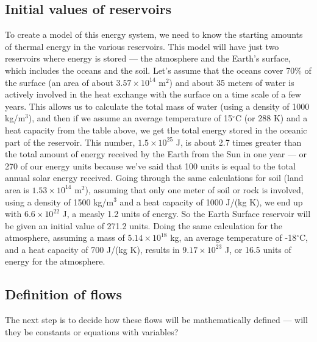 \documentclass[11pt,letterpaper]{article}
\begin{document}
\subsection{Initial values of reservoirs}
To create a model of this energy system, we need to know the starting amounts of thermal energy in the various reservoirs. This model
will have just two reservoirs where energy is stored --- the atmosphere and the Earth's surface, which includes the oceans and the soil.
Let's assume that the oceans cover 70\% of the surface (an area of about $3.57\times{10}^{14}$ m$^{2}$) and about 35 meters of water is actively involved in the heat exchange with the surface on a time scale of a few years. This allows us to calculate the total mass of water (using a density of 1000 kg/m$^3$), and then if we assume an average temperature of 15$^\circ$C (or 288 K) and a heat capacity from the table above, we get the total energy stored in the oceanic part of the reservoir. This number, $1.5\times{10}^{25}$ J, is about 2.7 times greater than the total amount of energy received by the Earth from the Sun in one year --- or 270 of our energy units because we've said that 100 units is equal to the total annual solar energy received. Going through the same calculations for soil (land area is $1.53\times{10}^{14}$ m$^2$), assuming that only one meter of soil or rock is involved, using a density of 1500 kg/m$^3$ and a heat capacity of 1000 J/(kg K), we end up with $6.6\times{10}^{22}$ J, a measly 1.2 units of energy. So the Earth Surface reservoir will be given an initial value of 271.2 units. Doing the same calculation for the atmosphere, assuming a mass of $5.14\times{10}^{18}$ kg, an average temperature of -18$^{\circ}$C, and a heat capacity of 700 J/(kg K), results in $9.17\times{10}^{23}$ J, or 16.5 units of energy for the atmosphere.

\subsection{Definition of flows}
The next step is to decide how these flows will be mathematically defined --- will they be constants or equations with variables? 
\end{document}
